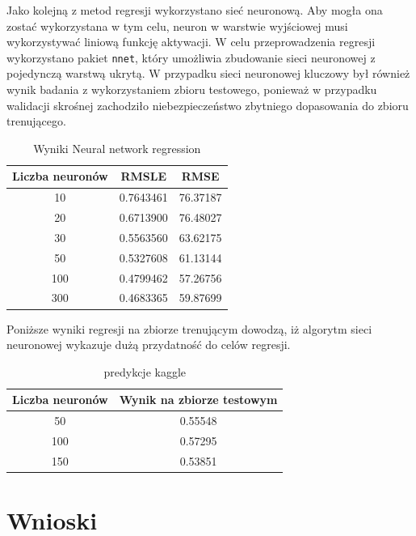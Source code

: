 \documentclass[a4paper,12pt]{article}
\begin{document}
    Jako kolejną z metod regresji wykorzystano sieć neuronową. Aby mogła ona zostać wykorzystana w tym celu, neuron w warstwie wyjściowej musi wykorzystywać
    liniową funkcję aktywacji. W celu przeprowadzenia regresji wykorzystano pakiet \texttt{nnet}, który umożliwia zbudowanie sieci neuronowej z pojedynczą
    warstwą ukrytą. W przypadku sieci neuronowej kluczowy był również wynik badania z wykorzystaniem zbioru testowego, ponieważ w przypadku walidacji
    skrośnej zachodziło niebezpieczeństwo zbytniego dopasowania do zbioru trenującego.
        \begin{table}
        	\centering
            \begin{tabular}{|c|c|c|}
            \hline 
            Liczba neuronów & RMSLE & RMSE \\ 
            \hline 
            10 & 0.7643461 & 76.37187 \\ 
            \hline 
            20 & 0.6713900 & 76.48027 \\ 
            \hline 
            30 & 0.5563560 & 63.62175 \\ 
            \hline 
            50 & 0.5327608 & 61.13144 \\ 
            \hline 
            100 & 0.4799462 & 57.26756 \\ 
            \hline 
            300 & 0.4683365 & 59.87699 \\ 
            \hline 
            \end{tabular} 
            \caption{Wyniki Neural network regression}
        \end{table}
        
        Poniższe wyniki regresji na zbiorze trenującym dowodzą, iż algorytm sieci neuronowej wykazuje dużą przydatność do celów regresji.
        
        \begin{table}
        	\centering
            \begin{tabular}{|c|c|}
            \hline 
            Liczba neuronów & Wynik na zbiorze testowym \\ 
            \hline 
            50 & 0.55548 \\ 
            \hline 
            100 & 0.57295 \\ 
            \hline 
            150 & 0.53851 \\ 
            \hline 
            \end{tabular} 
            \caption{predykcje kaggle}
        \end{table}    
    

\section{Wnioski}
 
\end{document}
